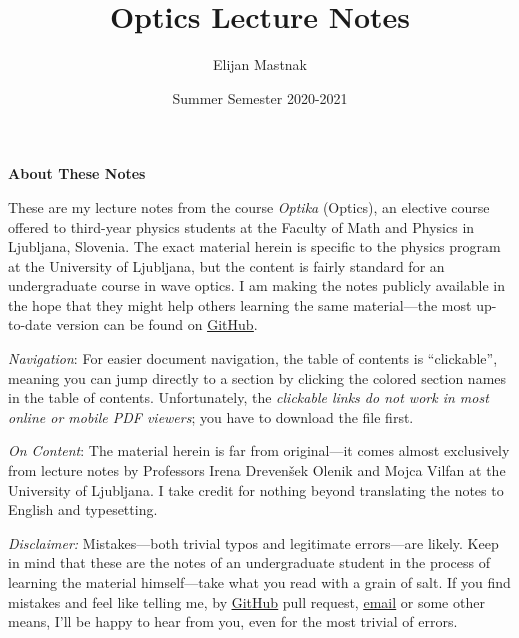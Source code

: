 \documentclass[11pt, a4paper]{article}
\begin{document}
\title{Optics Lecture Notes}
\author{Elijan Mastnak}
\date{Summer Semester 2020-2021}
\maketitle

\thispagestyle{empty}  %

\begin{center}
\textbf{About These Notes}
\end{center}
These are my lecture notes from the course \textit{Optika} (Optics), an elective course offered to third-year physics students at the Faculty of Math and Physics in Ljubljana, Slovenia. The exact material herein is specific to the physics program at the University of Ljubljana, but the content is fairly standard for an undergraduate course in wave optics. I am making the notes publicly available in the hope that they might help others learning the same material---the most up-to-date version can be found on \href{https://github.com/ejmastnak/fmf/tree/main/optics/}{\underline{GitHub}}.

\vspace{2mm}
\textit{Navigation}: For easier document navigation, the table of contents is ``clickable'', meaning you can jump directly to a section by clicking the colored section names in the table of contents. Unfortunately, the \textit{clickable links do not work in most online or mobile PDF viewers}; you have to download the file first.

\vspace{2mm}
\textit{On Content}: The material herein is far from original---it comes almost exclusively from lecture notes by Professors Irena Dreven\v{s}ek Olenik and Mojca Vilfan at the University of Ljubljana. I take credit for nothing beyond translating the notes to English and typesetting.

\vspace{2mm}
\textit{Disclaimer:} Mistakes---both trivial typos and legitimate errors---are likely. Keep in mind that these are the notes of an undergraduate student in the process of learning the material himself---take what you read with a grain of salt. If you find mistakes and feel like telling me, by \href{https://github.com/ejmastnak/fmf}{\underline{GitHub}} pull request, \href{mailto:ejmastnak@gmail.com}{\underline{email}} or some other means, I'll be happy to hear from you, even for the most trivial of errors.

\newpage
\end{document}
